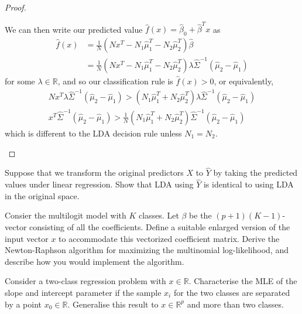 \begin{proof}
\begin{enumerate}
            We can then write our predicted value $\hat f(x) = \hat \beta_0 + \hat \beta^T x$ as \begin{align*}
                \hat f(x) &= \frac{1}{N}\left( N x^T - N_1 \hat \mu_1^T - N_2 \hat \mu_2^T \right) \hat \beta \\
                &=  \frac{1}{N}\left( N x^T - N_1 \hat \mu_1^T - N_2 \hat \mu_2^T \right) \lambda \hat \Sigma^{-1} (\hat \mu_2 - \hat \mu_1) 
            \end{align*} for some $\lambda \in \mathbb{R}$, and so our classification rule is $\hat f(x) > 0$, or equivalently, \begin{align*}
                N x^T \lambda \hat \Sigma^{-1} (\hat \mu_2 - \hat \mu_1) > (N_1 \hat \mu_1^T + N_2 \hat \mu_2^T) \lambda \hat \Sigma^{-1}(\hat \mu_2 - \hat \mu_1) \\
                x^T \hat \Sigma^{-1} (\hat \mu_2 - \hat \mu_1) > \frac{1}{N} \left( N_1 \hat \mu^T_1 + N_2 \hat \mu_2^T \right) \hat \Sigma^{-1} (\hat \mu_2 - \hat \mu_1)
            \end{align*} which is different to the LDA decision rule unless $N_1 = N_2$.
    \end{enumerate}
\end{proof}

\begin{exer}
    Suppose that we transform the original predictors $X$ to $\hat Y$ by taking the predicted values under linear regression.  Show that LDA using $\hat Y$ is identical to using LDA in the original space.
\end{exer}

\begin{exer}
    Consier the multilogit model with $K$ classes.  Let $\beta$ be the $(p+1)(K-1)$-vector consisting of all the coefficients.  Define a suitable enlarged version of the input vector $x$ to accommodate this vectorized coefficient matrix.  Derive the Newton-Raphson algorithm for maximizing the multinomial log-likelihood, and describe how you would implement the algorithm.
\end{exer}

\begin{exer}
    Consider a two-class regression problem with $x \in \mathbb{R}$.  Characterise the MLE of the slope and intercept parameter if the sample $x_i$ for the two classes are separated by a point $x_0 \in \mathbb{R}$.  Generalise this result to $x \in \mathbb{R}^p$ and more than two classes.
\end{exer}

